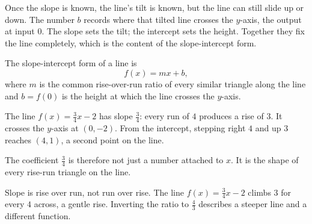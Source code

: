 \documentclass[12pt]{book}
\begin{document}
\begin{center}
\end{center}

Once the slope is known, the line's tilt is known, but the line can still slide up
or down. The number $b$ records where that tilted line crosses the $y$-axis, the
output at input $0$. The slope sets the tilt; the intercept sets the height. Together
they fix the line completely, which is the content of the slope-intercept form.
\begin{keyidea}
The slope-intercept form of a line is
\[
f(x)=mx+b,
\]
where $m$ is the common rise-over-run ratio of every similar triangle along the line
and $b=f(0)$ is the height at which the line crosses the $y$-axis.
\end{keyidea}

\begin{example}
The line $f(x)=\tfrac34 x-2$ has slope $\tfrac34$: every run of $4$ produces a rise
of $3$. It crosses the $y$-axis at $(0,-2)$. From the intercept, stepping right $4$
and up $3$ reaches $(4,1)$, a second point on the line.
\end{example}

The coefficient $\tfrac34$ is therefore not just a number attached to $x$. It is the
shape of every rise-run triangle on the line.

\begin{pitfall}
Slope is rise over run, not run over rise. The line $f(x)=\tfrac34x-2$ climbs $3$ for
every $4$ across, a gentle rise. Inverting the ratio to $\tfrac43$ describes a
steeper line and a different function.
\end{pitfall}
\end{document}
